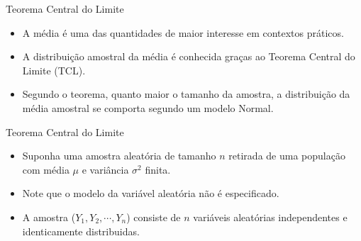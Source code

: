 \documentclass[
  ignorenonframetext,
  serif,
  professionalfont,
  usenames,
  dvipsnames,
  aspectratio = 169]{beamer}
\providecommand{\tightlist}{%
  \setlength{\itemsep}{0pt}\setlength{\parskip}{0pt}}
\renewcommand{\tightlist}{%
  \setlength{\itemsep}{0\baselineskip}
  \setlength{\parskip}{0.25\baselineskip}
}
\begin{document}
\begin{frame}{Teorema Central do Limite}
\protect\hypertarget{teorema-central-do-limite-1}{}
\begin{itemize}
\tightlist
\item
  A média é uma das quantidades de maior interesse em contextos
  práticos.
\end{itemize}

\vspace{0.3cm}

\begin{itemize}
\tightlist
\item
  A distribuição amostral da média é conhecida graças ao Teorema Central
  do Limite (TCL).
\end{itemize}

\vspace{0.3cm}

\begin{itemize}
\tightlist
\item
  Segundo o teorema, quanto maior o tamanho da amostra, a distribuição
  da média amostral se comporta segundo um modelo Normal.
\end{itemize}
\end{frame}

\begin{frame}{Teorema Central do Limite}
\protect\hypertarget{teorema-central-do-limite-2}{}
\begin{itemize}
\tightlist
\item
  Suponha uma amostra aleatória de tamanho \(n\) retirada de uma
  população com média \(\mu\) e variância \(\sigma^2\) finita.
\end{itemize}

\vspace{0.3cm}

\begin{itemize}
\tightlist
\item
  Note que o modelo da variável aleatória não é especificado.
\end{itemize}

\vspace{0.3cm}

\begin{itemize}
\tightlist
\item
  A amostra (\(Y_1, Y_2, \cdots, Y_n\)) consiste de \(n\) variáveis
  aleatórias independentes e identicamente distribuidas.
\end{itemize}
\end{frame}
\end{document}
